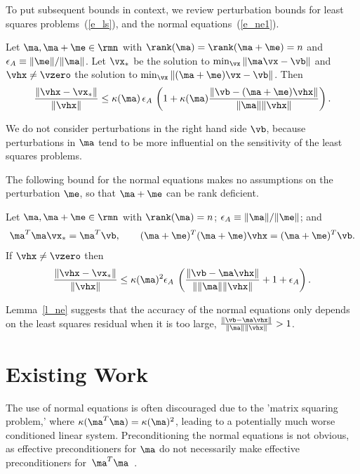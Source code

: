 \documentclass[final]{siamart220329}%
\begin{document}
To put subsequent bounds in context, we review perturbation bounds for least squares problems~(\ref{e_ls}), and the normal equations~(\ref{e_ne1}).

\begin{lemma}\label{l_ls}
Let $\ma, \ma+\me\in\rmn$ with $\rank(\ma)=\rank(\ma+\me)=n$ and 
$\epsilon_A\equiv \|\me\|/\|\ma\|$. Let $\vx_*$ be the solution 
to $\min_{\vx}{\|\ma\vx-\vb\|}$ and $\vhx\neq \vzero$ the solution to $\min_{\vx}{\|(\ma+\me)\vx-\vb\|}$.
Then
\begin{align*}
\frac{\|\vhx-\vx_*\|}{\|\vhx\|}\leq \kappa(\ma)\,\epsilon_A\, 
\left(1+\kappa(\ma)\frac{\|\vb-(\ma+\me)\vhx\|}{\|\ma\|\|\vhx\|}\right).
\end{align*}
\end{lemma}

We do not consider perturbations in the right hand side $\vb$, because perturbations in $\ma$ tend to be more influential on the sensitivity of the least squares problems.

The following bound for the normal equations makes no assumptions on the perturbation $\me$, so that $\ma+\me$ can be rank deficient.

\begin{lemma}\label{l_ne}
Let $\ma,\ma+\me\in\rmn$ with $\rank(\ma)=n$; 
$\epsilon_A\equiv \|\ma\|/\|\me\|$; and
\begin{align*}
\ma^T\ma\vx_*=\ma^T\vb, \qquad
(\ma+\me)^T(\ma+\me)\vhx=(\ma+\me)^T\vb.
\end{align*}
If $\vhx\neq \vzero$ then
\begin{align*}
\frac{\|\vhx-\vx_*\|}{\|\vhx\|}
\leq \kappa(\ma)^2\epsilon_A\>\left(
\frac{\|\vb-\ma\vhx\|}{\|\|\ma\|\|\vhx\|}+1+\epsilon_A\right).
\end{align*}
\end{lemma}

Lemma~\ref{l_ne} suggests that the accuracy
of the normal equations only depends on the least squares residual when it is too large,
$\frac{\|\vb-\ma\vhx\|}{\|\ma\|\|\vhx\|}>1$.


\section{Existing Work}\label{s_exist}
The use of normal equations is often discouraged due to the 'matrix squaring problem,' where 
$\kappa(\ma^T\ma)=\kappa(\ma)^2$, leading to a potentially much worse conditioned linear system. Preconditioning the normal equations is not obvious, as effective preconditioners for $\ma$ do not necessarily make effective preconditioners for~$\ma^T\ma$~\cite{Wathen2022}. 
\end{document}
